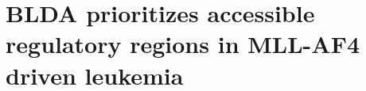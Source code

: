 

\chapter{BLDA prioritizes accessible regulatory regions in MLL-AF4 driven leukemia} \label{ch4}

\minitoc






% 





